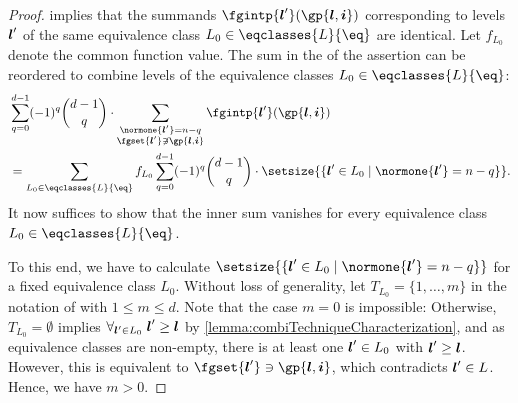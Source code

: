 \propCombiTechniqueZero*

\begin{proof}
  implies that the summands $\fgintp{\*l'}(\gp{\*l,\*i})$
  corresponding to levels ${\boldsymbol{l}}'$ of the same equivalence class
  $L_0 \in \eqclasses{L}{\eq}$ are identical.
  Let $f_{L_0}$ denote the common function value.
  The sum in the \lhs of the assertion can be reordered to combine
  levels of the equivalence classes $L_0 \in \eqclasses{L}{\eq}$:
  \begin{subequations}
    \begin{align}
      &\sum_{q=0}^{d-1} (-1)^q \binom{d-1}{q} \cdot
      \sum_{\substack{\normone{\*l'} = n - q\\\fgset{\*l'} \notni \gp{\*l,\*i}}}
      \fgintp{\*l'}(\gp{\*l,\*i})\\
      \label{eq:proofCombiTechniqueIdenticalValues2}
      &= \sum_{L_0 \in \eqclasses{L}{\eq}} f_{L_0} \sum_{q=0}^{d-1}
      (-1)^q \binom{d-1}{q} \cdot
      \setsize{\{\*l' \in L_0 \mid \normone{\*l'} = n - q\}}.
    \end{align}
  \end{subequations}
  It now suffices to show that the inner sum vanishes
  for every equivalence class $L_0 \in \eqclasses{L}{\eq}$.
  
  To this end, we have to calculate
  $\setsize{\{\*l' \in L_0 \mid \normone{\*l'} = n - q\}}$
  for a fixed equivalence class $L_0$.
  Without loss of generality,
  let $T_{L_0} = \{1, \dotsc, m\}$ in the notation of
  with $1 \le m \le d$.
  Note that the case $m = 0$ is impossible:
  Otherwise, $T_{L_0} = \emptyset$ implies
  $\forall_{{\boldsymbol{l}}' \in L_0}\;{\boldsymbol{l}}' \ge {\boldsymbol{l}}$ by
  \cref{lemma:combiTechniqueCharacterization}, and
  as equivalence classes are non-empty,
  there is at least one ${\boldsymbol{l}}' \in L_0$ with ${\boldsymbol{l}}' \ge {\boldsymbol{l}}$.
  However, this is equivalent to $\fgset{\*l'} \ni \gp{\*l,\*i}$,
  which contradicts ${\boldsymbol{l}}' \in L$.
  Hence, we have $m > 0$.
  

\end{proof}
